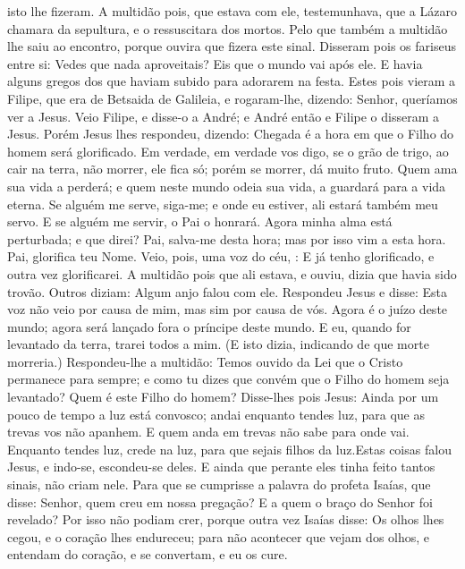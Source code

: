 {{} isto lhe fizeram.
A multidão pois, que estava com ele, testemunhava, que a Lázaro chamara da sepultura, e o ressuscitara dos mortos.
Pelo que também a multidão lhe saiu ao encontro, porque ouvira que fizera este sinal.
Disseram pois os fariseus entre si: Vedes que nada aproveitais? Eis que o mundo vai após ele.
E havia alguns gregos dos que haviam subido para adorarem na festa.
Estes pois vieram a Filipe, que era de Betsaida de Galileia, e rogaram-lhe, dizendo: Senhor, queríamos ver a Jesus.
Veio Filipe, e disse-o a André; e André então e Filipe o disseram a Jesus.
Porém Jesus lhes respondeu, dizendo: Chegada é a hora em que o Filho do homem será glorificado.
Em verdade, em verdade vos digo, se o grão de trigo, ao cair na terra, não morrer, ele fica só; porém se morrer, dá muito fruto.
Quem ama sua vida a perderá; e quem neste mundo odeia sua vida, a guardará para a vida eterna.
Se alguém me serve, siga-me; e onde eu estiver, ali estará também meu servo. E se alguém me servir, o Pai o honrará.
Agora minha alma está perturbada; e que direi? Pai, salva-me desta hora; mas por isso vim a esta hora.
Pai, glorifica teu Nome. Veio, pois, uma voz do céu,
{} : E já
{} tenho glorificado, e outra vez
{} glorificarei.
A multidão pois que ali estava, e
{} ouviu, dizia que havia sido trovão. Outros diziam: Algum anjo falou com ele.
Respondeu Jesus e disse: Esta voz não veio por causa de mim, mas sim por causa de vós.
Agora é o juízo deste mundo; agora será lançado fora o príncipe deste mundo.
E eu, quando for levantado da terra, trarei todos a mim.
(E isto dizia, indicando de que morte
{} morreria.)
Respondeu-lhe a multidão: Temos ouvido da Lei que o Cristo permanece para sempre; e como tu dizes que convém que o Filho do homem seja levantado? Quem é este Filho do homem?
Disse-lhes pois Jesus: Ainda por um pouco de tempo a luz está convosco; andai enquanto tendes luz, para que as trevas vos não apanhem. E quem anda em trevas não sabe para onde vai.
Enquanto tendes luz, crede na luz, para que sejais filhos da luz.Estas coisas falou Jesus, e indo-se, escondeu-se deles.
E ainda que perante eles tinha feito tantos sinais, não criam nele.
Para que se cumprisse a palavra do profeta Isaías, que disse: Senhor, quem creu em nossa pregação? E a quem o braço do Senhor foi revelado?
Por isso não podiam crer, porque outra vez Isaías disse:
Os olhos lhes cegou, e o coração lhes endureceu; para não acontecer que vejam dos olhos, e entendam do coração, e se convertam, e eu os cure.
}
